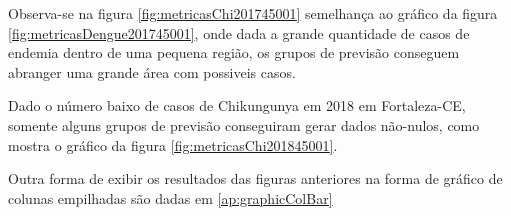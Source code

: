Observa-se na figura \ref{fig:metricasChi201745001} semelhança ao gráfico da figura \ref{fig:metricasDengue201745001}, onde dada a grande quantidade de casos de endemia dentro de uma pequena região, os grupos de previsão conseguem abranger uma grande área com possiveis casos.
\begin{figure}[!ht]
	\centering	
\end{figure}
\FloatBarrier

Dado o número baixo de casos de Chikungunya em 2018 em Fortaleza-CE, somente alguns grupos de previsão conseguiram gerar dados não-nulos, como mostra o gráfico da figura \ref{fig:metricasChi201845001}.
\begin{figure}[!ht]
	\centering	
\end{figure}
\FloatBarrier


Outra forma de exibir os resultados das figuras anteriores na forma de gráfico de colunas empilhadas são dadas em \ref{ap:graphicColBar}

